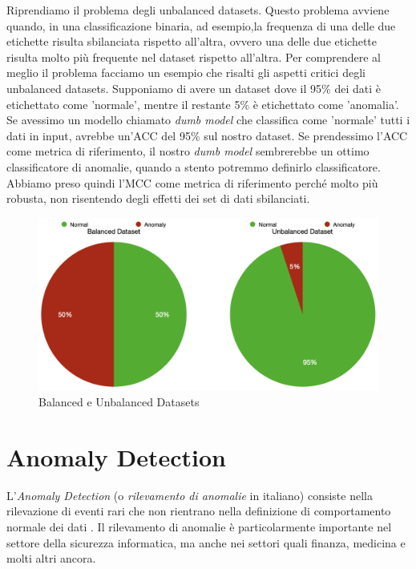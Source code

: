 Riprendiamo il problema degli unbalanced datasets. Questo problema avviene quando, in una classificazione binaria, ad esempio,la frequenza di una delle due etichette risulta sbilanciata rispetto all'altra, ovvero una delle due etichette risulta molto pi\`u frequente nel dataset rispetto all'altra. Per comprendere al meglio il problema facciamo un esempio che risalti gli aspetti critici degli unbalanced datasets. Supponiamo di avere un dataset dove il 95\% dei dati \`e etichettato come 'normale', mentre il restante 5\% \`e etichettato come 'anomalia'. Se avessimo un modello chiamato \textit{dumb model} che classifica come 'normale' tutti i dati in input, avrebbe un'ACC del 95\% sul nostro dataset. Se prendessimo l'ACC come metrica di riferimento, il nostro \textit{dumb model} sembrerebbe un ottimo classificatore di anomalie, quando a stento potremmo definirlo classificatore. Abbiamo preso quindi l'MCC come metrica di riferimento perch\'e molto pi\`u robusta, non risentendo degli effetti dei set di dati sbilanciati.
    
\begin{figure}[H]
    \centering
    \includegraphics[width=0.7\linewidth]{Balanced_Unbalanced_Dataset.png}
    \caption{Balanced e Unbalanced Datasets}
    \label{fig:enter-label}
\end{figure}

\vspace{1cm}

\section{Anomaly Detection}
L'\textit{Anomaly Detection} (o \textit{rilevamento di anomalie} in italiano) consiste nella rilevazione di eventi rari che non rientrano nella definizione di comportamento normale dei dati \cite{anomaly}. Il rilevamento di anomalie \`e particolarmente importante nel settore della sicurezza informatica, ma anche nei settori quali finanza, medicina e molti altri ancora. 


